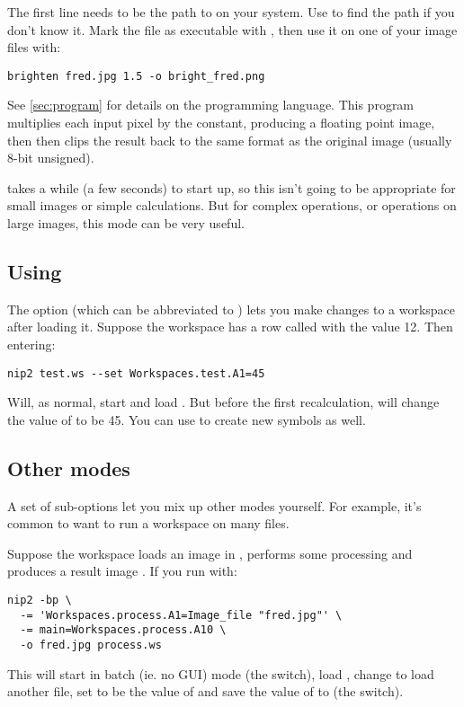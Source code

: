 \noindent
The first line needs to be the path to \nip{} on your system. Use  to find the path if you don't know it. Mark the file as executable with
, then use it on one of your image files with:

\begin{verbatim}
brighten fred.jpg 1.5 -o bright_fred.png
\end{verbatim}

\noindent
See \cref{sec:program} for details on the programming language. This program
multiplies each input pixel by the constant, producing a floating point image,
then then clips the result back to the same format as the original image
(usually 8-bit unsigned).

\nip{} takes a while (a few seconds) to start up, so this isn't going to be
appropriate for small images or simple calculations. But for complex
operations, or operations on large images, this mode can be very useful.

\subsection{Using }

The  option (which can be abbreviated to \ct{-=}) lets you make
changes to a workspace after loading it.  Suppose the workspace 
has a row called  with the value 12.  Then entering:

\begin{verbatim}
nip2 test.ws --set Workspaces.test.A1=45
\end{verbatim}

\noindent
Will, as normal, start \nip{} and load . But before the first
recalculation, \nip{} will change the value of  to be 45.  You can
use  to create new symbols as well.

\subsection{Other modes}

A set of sub-options let you mix up other modes yourself. For example, it's
common to want to run a workspace on many files.

Suppose the workspace  loads an image in , performs some
processing and produces a result image . If you run \nip{} with:

\begin{verbatim}
nip2 -bp \
  -= 'Workspaces.process.A1=Image_file "fred.jpg"' \
  -= main=Workspaces.process.A10 \
  -o fred.jpg process.ws
\end{verbatim}

\noindent
This will start \nip{} in batch (ie. no GUI) mode (the  switch), 
load , change  to load another file, set 
to be the value of  and save the value of  to  
(the \ct{-p} switch).

